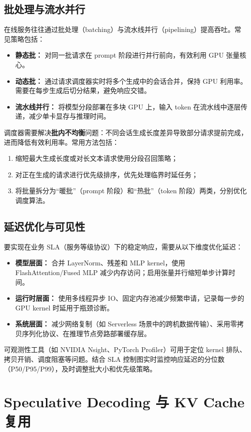 \documentclass[UTF8,zihao=-4]{ctexart}
\begin{document}
\subsection{批处理与流水并行}
在线服务往往通过批处理（batching）与流水线并行（pipelining）提高吞吐。常见策略包括：
\begin{itemize}
  \item \textbf{静态批：} 对同一批请求在 prompt 阶段进行并行前向，有效利用 GPU 张量核心。
  \item \textbf{动态批：} 通过请求调度器实时将多个生成中的会话合并，保持 GPU 利用率。需要在每步生成后切分结果，避免响应交错。
  \item \textbf{流水线并行：} 将模型分段部署在多块 GPU 上，输入 token 在流水线中逐层传递，减少单卡显存与推理时间。
\end{itemize}
调度器需要解决\textbf{批内不均衡}问题：不同会话生成长度差异导致部分请求提前完成，进而降低有效利用率。常用方法包括：
\begin{enumerate}
  \item 缩短最大生成长度或对长文本请求使用分段召回策略；
  \item 对正在生成的请求进行优先级排序，优先处理临界时延任务；
  \item 将批量拆分为“暖批”（prompt 阶段）和“热批”（token 阶段）两类，分别优化调度算法。
\end{enumerate}

\subsection{延迟优化与可见性}
要实现在业务 SLA（服务等级协议）下的稳定响应，需要从以下维度优化延迟：
\begin{itemize}
  \item \textbf{模型层面：} 合并 LayerNorm、残差和 MLP kernel，使用 FlashAttention/Fused MLP 减少内存访问；启用张量并行缩短单步计算时间。
  \item \textbf{运行时层面：} 使用多线程异步 IO、固定内存池减少频繁申请，记录每一步的 GPU kernel 时延用于瓶颈诊断。
  \item \textbf{系统层面：} 减少网络复制（如 Serverless 场景中的跨机数据传输）、采用零拷贝序列化协议、在推理节点旁路部署缓存层。
\end{itemize}
可观测性工具（如 NVIDIA Nsight、PyTorch Profiler）可用于定位 kernel 排队、拷贝开销、调度阻塞等问题。结合 SLA 控制图实时监控响应延迟的分位数（P50/P95/P99），及时调整批大小和优先级策略。

\section{Speculative Decoding 与 KV Cache 复用}
\end{document}

